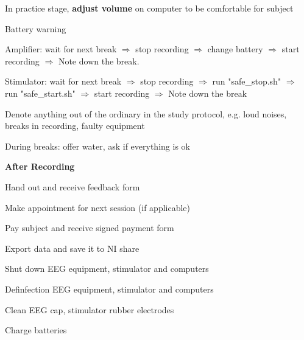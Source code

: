 \documentclass[journal, onecolumn, 11pt]{IEEEtran}
\newcommand\blankpage{%
	\null
	\thispagestyle{empty}%
	\addtocounter{page}{-1}%
	\newpage}
\begin{document}
\begin{itemize}
\begin{todolist}
			\item Battery warning
			\item Denote anything out of the ordinary in the study protocol, e.g. loud noises, breaks in recording, faulty equipment 
			\item During breaks: offer water, ask if everything is ok
		\end{todolist}
	
	\item \textbf{After Recording}
		\begin{todolist}
			\item Hand out and receive feedback form
			\item Make appointment for next session (if applicable)
			\item Pay subject and receive signed payment form
			\item Export data and save it to NI share
			\item Shut down EEG equipment, stimulator and computers
			\item Definfection EEG equipment, stimulator and computers
			\item Clean EEG cap, stimulator rubber electrodes
			\item Charge batteries
		\end{todolist}
\end{itemize}
\blankpage
	
	\blankpage
	
	
	
	
\end{document}
